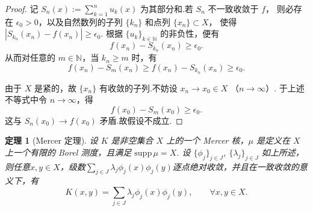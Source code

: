 \documentclass[12pt, a4paper, oneside]{ctexbook}
\newtheorem{theorem}{定理}[section]
\begin{document}
\begin{proof}
记 $S_n(x):=\sum_{k=1}^n u_k(x)$ 为其部分和.若 $S_n$ 不一致收敛于 $f$，
则必存在 $\epsilon_0>0$，以及自然数列的子列 $\{k_n\}$ 和点列 $\{x_n\}\subset X$，
使得 $|S_{k_n}(x_n)-f(x_n)|\ge \epsilon_0$.
根据 $\{u_k\}_{k\in\mathbb{N}}$ 的非负性，便有
\[
f(x_n)-S_{k_n}(x_n)\ge \epsilon_0.
\]
从而对任意的 $m\in\mathbb{N}$，当 $k_n\ge m$ 时，有
\[
f(x_n)-S_m(x_n)\ge f(x_n)-S_{k_n}(x_n)\ge \epsilon_0.
\]

由于 $X$ 是紧的，故 $\{x_n\}$ 有收敛的子列.不妨设 $x_n\to x_0\in X$ （$n\to\infty$）.
于上述不等式中令 $n\to\infty$，得
\[
f(x_0)-S_m(x_0)\ge \epsilon_0.
\]
这与 $S_n(x_0)\to f(x_0)$ 矛盾.故假设不成立.
\end{proof}



\begin{theorem}[Mercer 定理]\label{thm:mercer}
设 $K$ 是非空集合 $X$ 上的一个 Mercer 核，$\mu$ 是定义在 $X$ 上一个有限的 Borel 测度，且满足 $\mathrm{supp}\,\mu = X$.
设 $\{\phi_j\}_{j\in J}$, $\{\lambda_j\}_{j\in J}$ 如上所述，则任意$x,y\in X$，级数$\sum_{j\in J} \lambda_j \phi_j(x)\phi_j(y)$逐点绝对收敛，并且在一致收敛的意义下，有
\begin{equation}\label{eq:mercer}
    K(x,y) = \sum_{j\in J} \lambda_j \phi_j(x)\phi_j(y), 
    \qquad \forall x,y \in X.
\end{equation}
\end{theorem}
\end{document}
